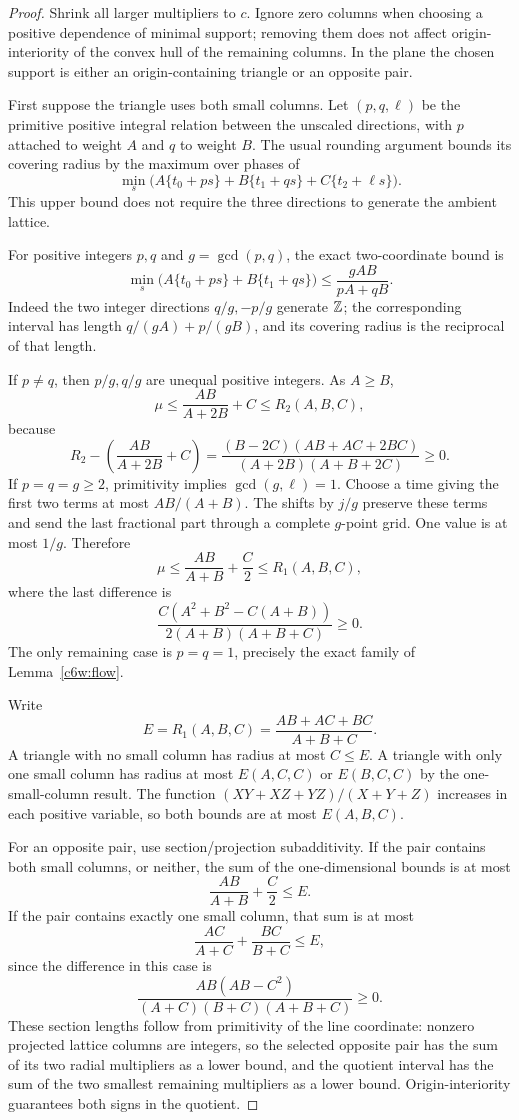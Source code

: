 \documentclass[11pt,a4paper]{article}
\theoremstyle{remark}\newtheorem{remark}[theorem]{Remark}
\begin{document}
\begin{proof}
Shrink all larger multipliers to $c$.  Ignore zero columns when
choosing a positive dependence of minimal support; removing
them does not affect origin-interiority of the convex hull of
the remaining columns.  In the plane the chosen support is
either an origin-containing triangle or an opposite pair.

First suppose the triangle uses both small columns.  Let
$(p,q,\ell)$ be the primitive positive integral relation between
the unscaled directions, with $p$ attached to weight $A$ and
$q$ to weight $B$.  The usual rounding argument bounds its
covering radius by the maximum over phases of
\[
 \min_s\bigl(A\{t_0+ps\}+B\{t_1+qs\}
                         +C\{t_2+\ell s\}\bigr).
\]
This upper bound does not require the three directions to
generate the ambient lattice.

For positive integers $p,q$ and $g=\gcd(p,q)$, the exact
two-coordinate bound is
\begin{equation}\label{c6w:twofreq}
 \min_s\bigl(A\{t_0+ps\}+B\{t_1+qs\}\bigr)
 \le\frac{gAB}{pA+qB}.
\end{equation}
Indeed the two integer directions $q/g,-p/g$ generate $\mathbb Z$;
the corresponding interval has length
$q/(gA)+p/(gB)$, and its covering radius is the reciprocal
of that length.

If $p\ne q$, then $p/g,q/g$ are unequal positive integers.
As $A\ge B$,
\[
 \mu\le\frac{AB}{A+2B}+C\le R_2(A,B,C),
\]
because
\[
 R_2-\left(\frac{AB}{A+2B}+C\right)
 =\frac{(B-2C)(AB+AC+2BC)}
 {(A+2B)(A+B+2C)}\ge0.
\]
If $p=q=g\ge2$, primitivity implies $\gcd(g,\ell)=1$.
Choose a time giving the first two terms at most $AB/(A+B)$.
The shifts by $j/g$ preserve these terms and send the last
fractional part through a complete $g$-point grid.  One value
is at most $1/g$.  Therefore
\[
 \mu\le\frac{AB}{A+B}+\frac C2\le R_1(A,B,C),
\]
where the last difference is
\[
 \frac{C(A^2+B^2-C(A+B))}{2(A+B)(A+B+C)}\ge0.
\]
The only remaining case is $p=q=1$, precisely the exact family
of Lemma~\ref{c6w:flow}.

Write
\[
 E=R_1(A,B,C)=\frac{AB+AC+BC}{A+B+C}.
\]
A triangle with no small column has radius at most $C\le E$.
A triangle with only one small column has radius at most
$E(A,C,C)$ or $E(B,C,C)$ by the one-small-column result.
The function $(XY+XZ+YZ)/(X+Y+Z)$ increases in each positive
variable, so both bounds are at most $E(A,B,C)$.

For an opposite pair, use section/projection subadditivity.
If the pair contains both small columns, or neither, the sum of
the one-dimensional bounds is at most
\[
 \frac{AB}{A+B}+\frac C2\le E.
\]
If the pair contains exactly one small column, that sum is at
most
\[
 \frac{AC}{A+C}+\frac{BC}{B+C}\le E,
\]
since the difference in this case is
\[
 \frac{AB(AB-C^2)}{(A+C)(B+C)(A+B+C)}\ge0.
\]
These section lengths follow from primitivity of the line
coordinate: nonzero projected lattice columns are integers,
so the selected opposite pair has the sum of its two radial
multipliers as a lower bound, and the quotient interval has
the sum of the two smallest remaining multipliers as a lower
bound.  Origin-interiority guarantees both signs in the quotient.


\end{proof}
\end{document}
